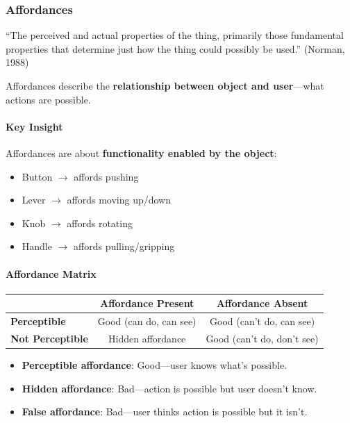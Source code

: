 \subsubsection*{Affordances}

\begin{defbox}[Affordance]
``The perceived and actual properties of the thing, primarily those fundamental properties that determine just how the thing could possibly be used.'' (Norman, 1988)

Affordances describe the \textbf{relationship between object and user}---what actions are possible.
\end{defbox}

\paragraph*{Key Insight}
Affordances are about \textbf{functionality enabled by the object}:
\begin{itemize}
  \item Button $\to$ affords pushing
  \item Lever $\to$ affords moving up/down
  \item Knob $\to$ affords rotating
  \item Handle $\to$ affords pulling/gripping
\end{itemize}

\paragraph*{Affordance Matrix}

\begin{center}
\renewcommand{\arraystretch}{1.3}
\begin{tabular}{@{} l | c c @{}}
\toprule
& \textbf{Affordance Present} & \textbf{Affordance Absent} \\
\midrule
\textbf{Perceptible} & \textcolor{ThmGreen}{Good} (can do, can see) & \textcolor{ThmGreen}{Good} (can't do, can see) \\
\textbf{Not Perceptible} & \textcolor{TipRed}{Hidden affordance} & \textcolor{ThmGreen}{Good} (can't do, don't see) \\
\bottomrule
\end{tabular}
\end{center}

\begin{itemize}
  \item \textbf{Perceptible affordance}: Good---user knows what's possible.
  \item \textbf{Hidden affordance}: Bad---action is possible but user doesn't know.
  \item \textbf{False affordance}: Bad---user thinks action is possible but it isn't.
\end{itemize}

